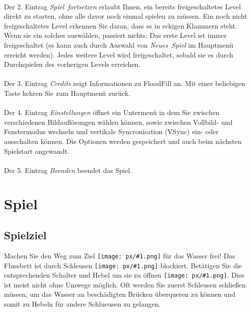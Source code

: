 \documentclass[oneside,12pt]{scrartcl}
\newcommand{\ui}[1]{\mbox{\textit{#1}}}
\newcommand{\inlpx}[1]{\texttt{[image: px/\#1.png]}}
\begin{document}
\paragraph{} Der 2. Eintrag \ui{Spiel fortsetzen} erlaubt Ihnen, ein bereits freigeschaltetes Level direkt zu starten, ohne alle davor noch einmal spielen zu müssen. Ein noch nicht freigeschaltetes Level erkennen Sie daran, dass es in eckigen Klammern steht. Wenn sie ein solches auswählen, passiert nichts. Das erste Level ist immer freigeschaltet (es kann auch durch Auswahl von \ui{Neues Spiel} im Hauptmenü erreicht werden). Jedes weitere Level wird freigeschaltet, sobald sie es durch Durchspielen des vorherigen Levels erreichen.

\paragraph{} Der 3. Eintrag \ui{Credits} zeigt Informationen zu FloodFill an. Mit einer beliebigen Taste kehren Sie zum Hauptmenü zurück.

\paragraph{} Der 4. Eintrag \ui{Einstellungen} öffnet ein Untermenü in dem Sie zwischen verschiedenen Bildauflösungen wählen können, sowie zwischen Vollbild- und Fenstermodus wechseln und vertikale Syncronisation (VSync) ein- oder ausschalten können. Die Optionen werden gespeichert und auch beim nächsten Spielstart angewandt.

\paragraph{} Der 5. Eintrag \ui{Beenden} beendet das Spiel.


\section{Spiel}
\subsection{Spielziel}
Machen Sie den Weg zum Ziel \inlpx{goal} für das Wasser frei! Das Flussbett ist durch Schleusen \inlpx{lock} blockiert. Betätigen Sie die entsprechenden Schalter und Hebel um sie zu öffnen \inlpx{lock_open}. Dies ist meist nicht ohne Umwege möglich. Oft werden Sie zuerst Schleusen schließen müssen, um das Wasser an beschädigten Brücken überqueren zu können und somit zu Hebeln für andere Schlueusen zu gelangen.
\end{document}
